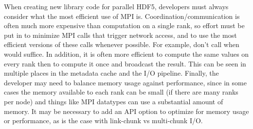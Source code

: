 \begin{itemize}
When creating new library code for parallel HDF5, developers must always consider what the most efficient use of MPI is. Coordination/communication is often much more expensive than computation on a single rank, so effort must be put in to minimize MPI calls that trigger network access, and to use the most efficient versions of these calls whenever possible. For example, don't call  when  would suffice. In addition, it is often more efficient to compute the same values on every rank then to compute it once and broadcast the result. This can be seen in multiple places in the metadata cache and the I/O pipeline. Finally, the developer may need to balance memory usage against performance, since in some cases the memory available to each rank can be small (if there are many ranks per node) and things like MPI datatypes can use a substantial amount of memory. It may be necessary to add an API option to optimize for memory usage or performance, as is the case with link-chunk vs multi-chunk I/O.

\end{itemize}